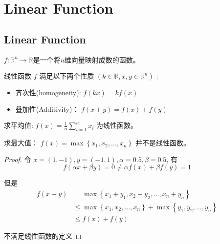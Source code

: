\chapter{Linear Function}

\section{Linear Function}

\begin{definition}
    $f: \mathbb{R}^{n} \rightarrow \mathbb{R}$是一个将$n$维向量映射成数的函数。 

    线性函数 $ f $ 满足以下两个性质 $ \left(k \in \mathbb{R}, x, y \in \mathbb{R}^{n}\right) $ :

    \begin{itemize}
        \item 齐次性(homogeneity): $ f(k x)=k f(x) $
        \item 叠加性(Additivity)： $ f(x+y)=f(x)+f(y) $
    \end{itemize}
\end{definition}

\begin{example}
    求平均值: $ f(x)=\frac{1}{n} \sum_{i=1}^{n} x_{i} $ 为线性函数。 
\end{example}

\begin{example}
    求最大值： $ f(x)=\max \left\{x_{1}, x_{2}, \ldots, x_{n}\right\} $ 并不是线性函数。 
\end{example}

\begin{proof}
   令 $ x=(1,-1), y=(-1,1), \alpha=0.5, \beta=0.5 $, 
   有 \begin{equation} f(\alpha x+\beta y)=0 \neq \alpha f(x)+\beta f(y)=1 \end{equation}

    但是
   \begin{equation} \begin{aligned} f(x+y) 
    &=\max \left\{x_{1}+y_{1}, x_{2}+y_{2}, \ldots, x_{n}+y_{n}\right\} 
    \\ & \leq \max \left\{x_{1}, x_{2}, \ldots, x_{n}\right\}+\max \left\{y_{1}, y_{2}, \ldots, y_{n}\right\} 
    \\ & \leq f(x)+f(y) \end{aligned} \end{equation}

    不满足线性函数的定义
\end{proof}

